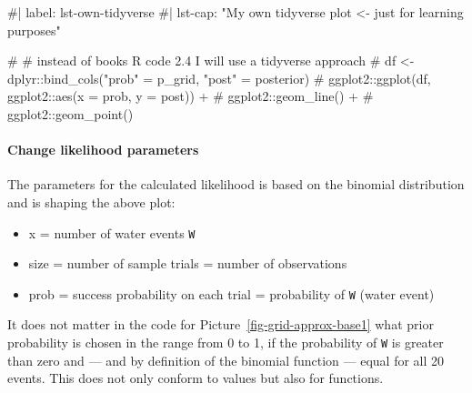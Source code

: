 \documentclass[
  letterpaper,
  DIV=11,
  numbers=noendperiod]{scrreprt}
\let\oldparagraph\paragraph
\renewcommand{\paragraph}[1]{\oldparagraph{#1}\mbox{}}
\newenvironment{Shaded}{\begin{snugshade}}{\end{snugshade}}
\newcommand{\CommentTok}[1]{\textcolor[rgb]{0.37,0.37,0.37}{#1}}
\providecommand{\tightlist}{%
  \setlength{\itemsep}{0pt}\setlength{\parskip}{0pt}}\usepackage{longtable,booktabs,array}
\begin{document}
\begin{Shaded}
\begin{Highlighting}[]
\CommentTok{\#| label: lst{-}own{-}tidyverse}
\CommentTok{\#| lst{-}cap: "My own tidyverse plot \textless{}{-}  just for learning purposes"}

\CommentTok{\# \# instead of books R code 2.4 I will use a tidyverse approach}
\CommentTok{\# df \textless{}{-} dplyr::bind\_cols("prob" = p\_grid, "post" = posterior)}
\CommentTok{\# ggplot2::ggplot(df, ggplot2::aes(x = prob, y = post)) +}
\CommentTok{\#     ggplot2::geom\_line() +}
\CommentTok{\#     ggplot2::geom\_point()}
\end{Highlighting}
\end{Shaded}

\hypertarget{change-likelihood-parameters}{%
\paragraph{Change likelihood
parameters}\label{change-likelihood-parameters}}

The parameters for the calculated likelihood is based on the binomial
distribution and is shaping the above plot:

\begin{itemize}
\tightlist
\item
  x = number of water events \texttt{W}
\item
  size = number of sample trials = number of observations
\item
  prob = success probability on each trial = probability of \texttt{W}
  (water event)
\end{itemize}

It does not matter in the code for Picture~\ref{fig-grid-approx-base1}
what prior probability is chosen in the range from 0 to 1, if the
probability of \texttt{W} is greater than zero and --- and by definition
of the binomial function --- equal for all 20 events. This does not only
conform to values but also for functions.
\end{document}
